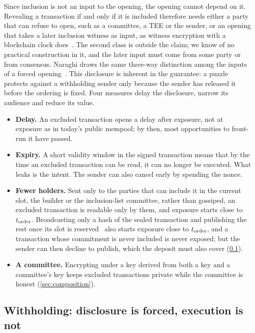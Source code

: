 Since inclusion is not an input to the opening, the opening cannot depend on it. Revealing a transaction if and only if it is included therefore needs either a party that can refuse to open, such as a committee, a TEE or the sender, or an opening that takes a later inclusion witness as input, as witness encryption with a blockchain clock does~\cite{LJKW18}. The second class is outside the claim; we know of no practical construction in it, and the later input must come from some party or from consensus. Naraghi draws the same three-way distinction among the inputs of a forced opening~\cite{Naraghi26}. This disclosure is inherent in the guarantee: a puzzle protects against a withholding sender only because the sender has released it before the ordering is fixed. Four measures delay the disclosure, narrow its audience and reduce its value.
\begin{itemize}[leftmargin=1.5em]
  \item \textbf{Delay.} An excluded transaction opens a delay after exposure, not at exposure as in today's public mempool; by then, most opportunities to front-run it have passed.
  \item \textbf{Expiry.} A short validity window in the signed transaction means that by the time an excluded transaction can be read, it can no longer be executed. What leaks is the intent. The sender can also cancel early by spending the nonce.
  \item \textbf{Fewer holders.} Sent only to the parties that can include it in the current slot, the builder or the inclusion-list committee, rather than gossiped, an excluded transaction is readable only by them, and exposure starts close to $t_{\mathrm{order}}$. Broadcasting only a hash of the sealed transaction and publishing the rest once its slot is reserved~\cite{Herold26,Naraghi26} also starts exposure close to $t_{\mathrm{order}}$, and a transaction whose commitment is never included is never exposed; but the sender can then decline to publish, which the deposit must also cover (\cref{sec:withholding}).
  \item \textbf{A committee.} Encrypting under a key derived from both a \leanseal key and a committee's key keeps excluded transactions private while the committee is honest (\cref{sec:composition}).
\end{itemize}

\subsection{Withholding: disclosure is forced, execution is not}\label{sec:withholding}

